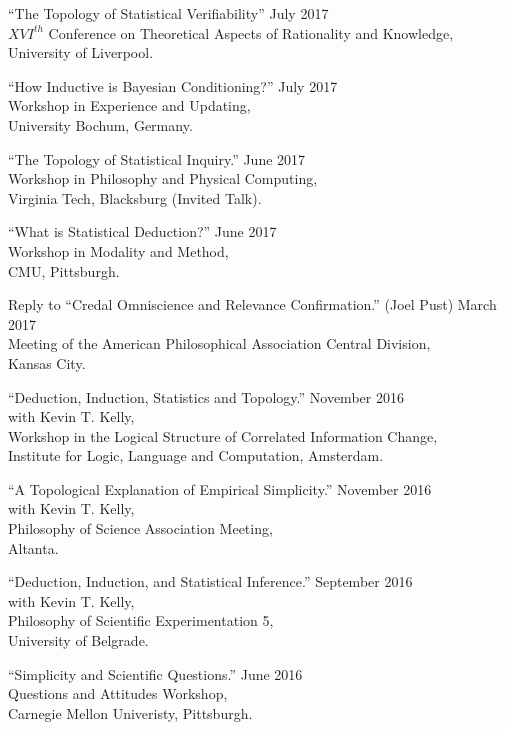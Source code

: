 \documentclass[12pt]{res} %
\begin{document}
\begin{resume}
``The Topology of Statistical Verifiability'' \hfill July 2017\\
$XVI^{th}$ Conference on Theoretical Aspects of Rationality and Knowledge,\\
University of Liverpool. 

``How Inductive is Bayesian Conditioning?'' \hfill July 2017\\
Workshop in Experience and Updating,\\
University Bochum, Germany.

``The Topology of Statistical Inquiry.'' \hfill June 2017\\
Workshop in Philosophy and Physical Computing, \\
Virginia Tech, Blacksburg (Invited Talk).

``What is Statistical Deduction?'' \hfill June 2017\\
Workshop in Modality and Method, \\
CMU, Pittsburgh.

Reply to ``Credal Omniscience and Relevance Confirmation.'' (Joel Pust) \hfill March 2017\\
Meeting of the American Philosophical Association Central Division,\\ 
Kansas City.

``Deduction, Induction, Statistics and Topology.'' \hfill November 2016\\
with Kevin T. Kelly,\\
 Workshop in the Logical Structure of Correlated Information Change,\\ Institute for Logic, Language and Computation, Amsterdam.

``A Topological Explanation of Empirical Simplicity.'' \hfill November 2016\\
with Kevin T. Kelly,\\
Philosophy of Science Association Meeting, \\
Altanta.

``Deduction, Induction, and Statistical Inference.'' \hfill September 2016\\
with Kevin T. Kelly,\\
Philosophy of Scientific Experimentation 5,\\
University of Belgrade.

``Simplicity and Scientific Questions.'' \hfill June 2016\\ 
Questions and Attitudes Workshop,\\
Carnegie Mellon Univeristy, Pittsburgh.


\end{resume}
\end{document}
